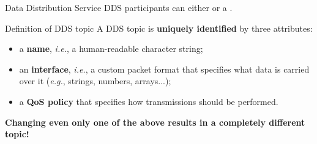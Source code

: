 \begin{frame}{Data Distribution Service}
	DDS participants can either  or  a .
	\begin{block}{Definition of DDS topic}
		A DDS topic is \textbf{uniquely identified} by three attributes:
		\begin{itemize}
			\item a \textbf{name}, \emph{i.e.}, a human-readable character string;
			\item an \textbf{interface}, \emph{i.e.}, a custom packet format that specifies what data is carried over it (\emph{e.g.}, strings, numbers, arrays...);
			\item a \textbf{QoS policy} that specifies how transmissions should be performed.
		\end{itemize}
	\end{block}
	\begin{block}{}
		\centering
		\textbf{Changing even only one of the above results in a completely different topic!}
	\end{block}
\end{frame}
